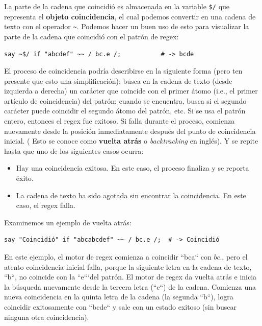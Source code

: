 La parte de la cadena que coincidió es almacenada en la variable
\verb|$/| que representa el {\bf objeto coincidencia}, el cual
podemos convertir en una cadena de texto con el operador \verb|~|.
Podemos hacer un buen uso de esto para visualizar la parte de la
cadena que coincidió con el patrón de regex:

\begin{lstlisting}
say ~$/ if "abcdef" ~~ / bc.e /;           # -> bcde
\end{lstlisting}
%



El proceso de coincidencia podría describirse en la siguiente
forma (pero ten presente que esto una simplificación): busca en 
la cadena de texto (desde izquierda a derecha) un carácter que 
coincide con el primer átomo (i.e., el primer artículo de 
coincidencia) del patrón; cuando se encuentra, busca si el segundo
carácter puede coincidir el segundo átomo del patrón, etc. Si
se usa el patrón entero, entonces el regex fue exitoso. Si falla
durante el proceso, comienza nuevamente desde la posición 
inmediatamente después del punto de coincidencia inicial. (
Esto se conoce como {\bf vuelta atrás} o \emph{backtracking} en inglés).
Y se repite hasta que uno de los siguientes casos ocurra:

\begin{itemize}
\item Hay una coincidencia exitosa. En este caso, el proceso
finaliza y se reporta éxito. 
\item La cadena de texto ha sido agotada sin encontrar la 
coincidencia. En este caso, el regex falla.
\end{itemize}

Examinemos un ejemplo de vuelta atrás:
\begin{lstlisting}
say "Coincidió" if "abcabcdef" ~~ / bc.e /;  # -> Coincidió
\end{lstlisting}
%

En este ejemplo, el motor de regex comienza a coincidir 
``bca`` con $bc.$, pero el atento coincidencia inicial falla,
porque la siguiente letra en la cadena de texto, ``b``, no
coincide con la ``e```del patrón. El motor de regex da vuelta
atrás e inicia la búsqueda nuevamente desde la tercera letra (``c``)
de la cadena. Comienza una nueva coincidencia en la quinta letra de
la cadena (la segunda ``b``), logra coincidir exitosamente con
``bcde`` y sale con un estado exitoso (sin buscar ninguna otra
coincidencia).

